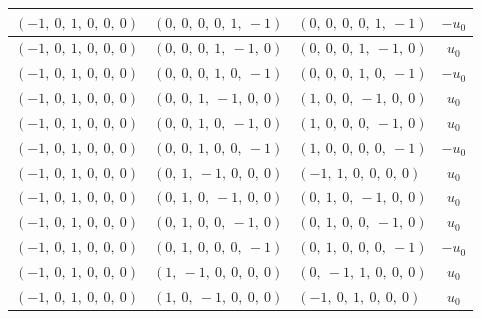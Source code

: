 \documentclass[11pt]{article}
\theoremstyle{definition}
\begin{document}
\begin{longtable}{|l|l|l|c|}
    \hline
    $\left( -1, \  0, \  1, \  0, \  0, \  0\right)$ & $\left( 0, \  0, \  0, \  0, \  1, \  -1\right)$ & $\left( 0, \  0, \  0, \  0, \  1, \  -1\right)$ & $- u_{0}$ \\
    \hline
    $\left( -1, \  0, \  1, \  0, \  0, \  0\right)$ & $\left( 0, \  0, \  0, \  1, \  -1, \  0\right)$ & $\left( 0, \  0, \  0, \  1, \  -1, \  0\right)$ & $u_{0}$ \\
    \hline
    $\left( -1, \  0, \  1, \  0, \  0, \  0\right)$ & $\left( 0, \  0, \  0, \  1, \  0, \  -1\right)$ & $\left( 0, \  0, \  0, \  1, \  0, \  -1\right)$ & $- u_{0}$ \\
    \hline
    $\left( -1, \  0, \  1, \  0, \  0, \  0\right)$ & $\left( 0, \  0, \  1, \  -1, \  0, \  0\right)$ & $\left( 1, \  0, \  0, \  -1, \  0, \  0\right)$ & $u_{0}$ \\
    \hline
    $\left( -1, \  0, \  1, \  0, \  0, \  0\right)$ & $\left( 0, \  0, \  1, \  0, \  -1, \  0\right)$ & $\left( 1, \  0, \  0, \  0, \  -1, \  0\right)$ & $u_{0}$ \\
    \hline
    $\left( -1, \  0, \  1, \  0, \  0, \  0\right)$ & $\left( 0, \  0, \  1, \  0, \  0, \  -1\right)$ & $\left( 1, \  0, \  0, \  0, \  0, \  -1\right)$ & $- u_{0}$ \\
    \hline
    $\left( -1, \  0, \  1, \  0, \  0, \  0\right)$ & $\left( 0, \  1, \  -1, \  0, \  0, \  0\right)$ & $\left( -1, \  1, \  0, \  0, \  0, \  0\right)$ & $u_{0}$ \\
    \hline
    $\left( -1, \  0, \  1, \  0, \  0, \  0\right)$ & $\left( 0, \  1, \  0, \  -1, \  0, \  0\right)$ & $\left( 0, \  1, \  0, \  -1, \  0, \  0\right)$ & $u_{0}$ \\
    \hline
    $\left( -1, \  0, \  1, \  0, \  0, \  0\right)$ & $\left( 0, \  1, \  0, \  0, \  -1, \  0\right)$ & $\left( 0, \  1, \  0, \  0, \  -1, \  0\right)$ & $u_{0}$ \\
    \hline
    $\left( -1, \  0, \  1, \  0, \  0, \  0\right)$ & $\left( 0, \  1, \  0, \  0, \  0, \  -1\right)$ & $\left( 0, \  1, \  0, \  0, \  0, \  -1\right)$ & $- u_{0}$ \\
    \hline
    $\left( -1, \  0, \  1, \  0, \  0, \  0\right)$ & $\left( 1, \  -1, \  0, \  0, \  0, \  0\right)$ & $\left( 0, \  -1, \  1, \  0, \  0, \  0\right)$ & $u_{0}$ \\
    \hline
    $\left( -1, \  0, \  1, \  0, \  0, \  0\right)$ & $\left( 1, \  0, \  -1, \  0, \  0, \  0\right)$ & $\left( -1, \  0, \  1, \  0, \  0, \  0\right)$ & $u_{0}$ \\

\end{longtable}
\end{document}
